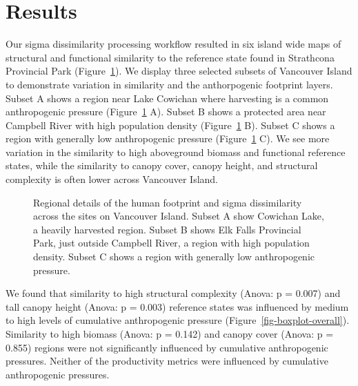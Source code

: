 \documentclass[
]{agujournal2019}
\begin{document}
\section{Results}\label{results}

Our sigma dissimilarity processing workflow resulted in six island wide
maps of structural and functional similarity to the reference state
found in Strathcona Provincial Park (Figure~\ref{fig-regional}). We
display three selected subsets of Vancouver Island to demonstrate
variation in similarity and the anthorpogenic footprint layers. Subset A
shows a region near Lake Cowichan where harvesting is a common
anthropogenic pressure (Figure~\ref{fig-regional} A). Subset B shows a
protected area near Campbell River with high population density
(Figure~\ref{fig-regional} B). Subset C shows a region with generally
low anthropogenic pressure (Figure~\ref{fig-regional} C). We see more
variation in the similarity to high aboveground biomass and functional
reference states, while the similarity to canopy cover, canopy height,
and structural complexity is often lower across Vancouver Island.

\label{cell-fig-regional}
\begin{figure}[H]


\caption{\label{fig-regional}Regional details of the human footprint and
sigma dissimilarity across the sites on Vancouver Island. Subset A show
Cowichan Lake, a heavily harvested region. Subset B shows Elk Falls
Provincial Park, just outside Campbell River, a region with high
population density. Subset C shows a region with generally low
anthropogenic pressure.}

\end{figure}%

We found that similarity to high structural complexity (Anova: p =
0.007) and tall canopy height (Anova: p = 0.003) reference states was
influenced by medium to high levels of cumulative anthropogenic pressure
(Figure~\ref{fig-boxplot-overall}). Similarity to high biomass (Anova: p
= 0.142) and canopy cover (Anova: p = 0.855) regions were not
significantly influenced by cumulative anthropogenic pressures. Neither
of the productivity metrics were influenced by cumulative anthropogenic
pressures.
\end{document}
